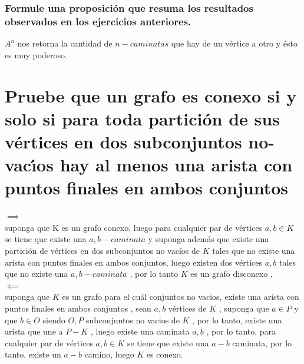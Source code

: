 \documentclass[10pt,a4paper]{article} %
\begin{document}
            \subsubsection{Formule una proposición que resuma los resultados
            observados en los ejercicios anteriores.}
                $ A ^{n}   $ nos retorna la cantidad de $ n-caminatas  $ que
                hay de un vértice a otro y ésto es muy poderoso.



    \section{Pruebe que un grafo es conexo si y solo si para toda partición de
    sus vértices en dos subconjuntos no-vacı́os hay al menos una arista con
    puntos finales en ambos conjuntos}
        $ \implies  $
        \\ suponga que K es un grafo conexo, luego para cualquier par de
        vértices $ a,b \in K  $  se tiene que existe una $ a,b-caminata  $ y
        suponga además que existe una partición de vértices en dos subconjuntos
        no vacíos de $ K  $ tales que no existe una arista con puntos finales
        en ambos conjuntos, luego existen dos vértices $ a,b  $ tales que no
        existe una $ a,b-caminata $ , por lo tanto $ K  $ es un grafo disconexo
        .
        \\ $ \impliedby  $
        \\ suponga que $ K  $ es un grafo para el cuál conjuntos no vacios,
        existe una arista con puntos finales en ambos conjuntos , sean $ a,b  $
        vértices de $ K  $ , suponga que $ a \in P  $ y que $ b \in O  $ siendo
        $ O,P  $ subconjuntos no vacios de $ K  $ , por lo tanto, existe una
        arista que une a $ P-K  $ , luego existe una caminata $ a,b  $ , por lo
        tanto, para cualquier par de vértices $ a,b \in K$ se tiene que existe
        una $ a-b  $ caminata, por lo tanto, existe un $ a-b   $ camino, luego
        $ K  $ es conexo.
\end{document}
